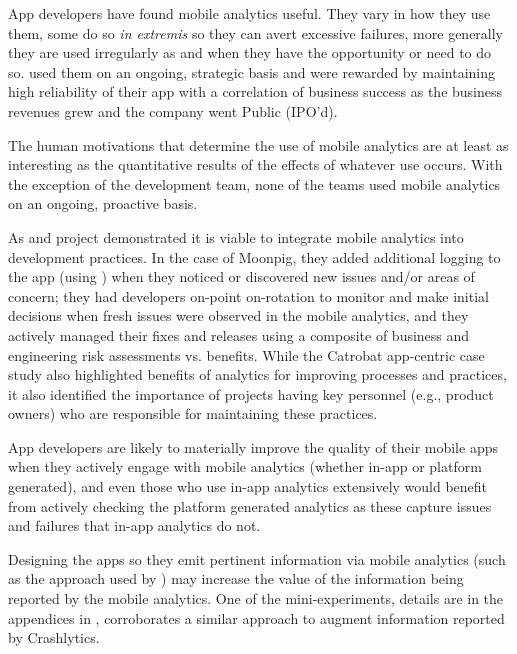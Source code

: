  App developers have found mobile analytics useful. They vary in how they use them, some do so \emph{in extremis} so they can avert excessive failures, more generally they are used irregularly as and when they have the opportunity or need to do so.  used them on an ongoing, strategic basis and were rewarded by maintaining high reliability of their app with a correlation of business success as the business revenues grew and the company went Public (IPO'd). 

The human motivations that determine the use of mobile analytics are at least as interesting as the quantitative results of the effects of whatever use occurs. With the exception of the  development team, none of the teams used mobile analytics on an ongoing, proactive basis. 

As  and  project demonstrated it is viable to integrate mobile analytics into development practices. In the case of Moonpig, they added additional logging to the app (using ) when they noticed or discovered new issues and/or areas of concern; they had developers on-point on-rotation to monitor and make initial decisions when fresh issues were observed in the mobile analytics, and they actively managed their fixes and releases using a composite of business and engineering risk assessments vs. benefits. While the Catrobat app-centric case study also highlighted benefits of analytics for improving processes and practices, it also identified the importance of projects having key personnel (e.g., product owners) who are responsible for maintaining these practices.

App developers are likely to materially improve the quality of their mobile apps when they actively engage with mobile analytics (whether in-app or platform generated), and even those who use in-app analytics extensively would benefit from actively checking the platform generated analytics as these capture issues and failures that in-app analytics do not.

Designing the apps so they emit pertinent information via mobile analytics (such as the approach used by ) may increase the value of the information being reported by the mobile analytics. One of the mini-experiments, details are in the appendices in , corroborates a  similar approach to augment information reported by Crashlytics. 



